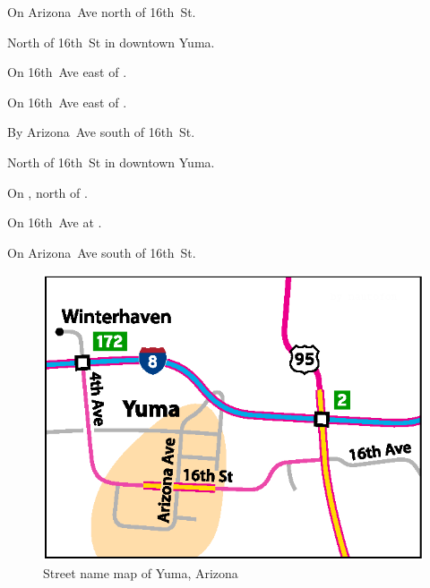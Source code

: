 
\begin{LocationList}

On Arizona~Ave north of 16th~St.

North of 16th~St in downtown Yuma.

\Location{\GarageHQ \Garage}
On 16th~Ave east of .

On 16th~Ave east of .

By Arizona~Ave south of 16th~St.

North of 16th~St in downtown Yuma.

On , north of  .

\Location{\TruckStop \Gas \Rest \Weigh}
On 16th~Ave at .

On Arizona~Ave south of 16th~St.

\end{LocationList}

\begin{figure}[hp]
\includegraphics[scale=0.77]{cities/arizona/yuma}
\centering\caption{Street name map of Yuma, Arizona}
\end{figure}
